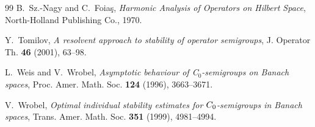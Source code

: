 \documentclass[11pt,intlimits, draft,oneside]{amsart}
\theoremstyle{definition}
\begin{document}
\begin{thebibliography}{99}
B.~Sz.-Nagy and C.~Foia{\c{s}}, %
\textit{Harmonic {A}nalysis of {O}perators on {H}ilbert {S}pace}, %
North-Holland Publishing Co., 1970. %


Y.~Tomilov, %
\textit{A resolvent approach to stability of operator semigroups}, %
J. Operator Th. \textbf{46} (2001), 63--98. %


L.~Weis and V.~Wrobel, %
\textit{Asymptotic behaviour of {C}$_0$-semigroups on {B}anach spaces}, %
Proc. Amer. Math. Soc. \textbf{124} (1996), 3663--3671. %


{V.~Wrobel}, %
\textit{Optimal individual stability estimates for $C\sb 0$-semigroups in Banach spaces}, %
{Trans. Amer. Math. Soc.}  \textbf{351} (1999), 4981--4994.%

%
%

\end{thebibliography}


\parindent0pt
\end{document}
